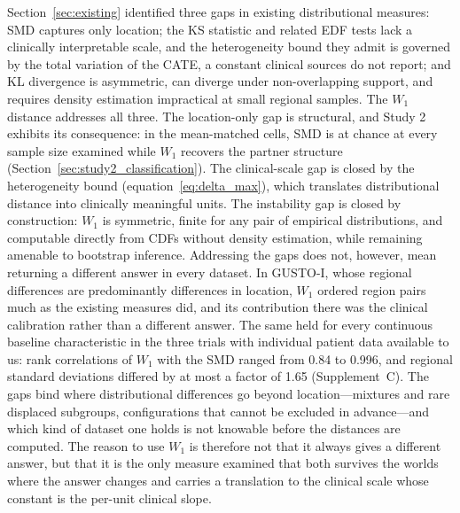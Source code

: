 \documentclass[AMA,Times1COL]{WileyNJDv5}
\begin{document}
Section~\ref{sec:existing} identified three gaps in existing distributional measures: SMD captures only location; the KS statistic and related EDF tests lack a clinically interpretable scale, and the heterogeneity bound they admit is governed by the total variation of the CATE, a constant clinical sources do not report; and KL divergence is asymmetric, can diverge under non-overlapping support, and requires density estimation impractical at small regional samples. The $W_1$ distance addresses all three. The location-only gap is structural, and Study 2 exhibits its consequence: in the mean-matched cells, SMD is at chance at every sample size examined while $W_1$ recovers the partner structure (Section~\ref{sec:study2_classification}). The clinical-scale gap is closed by the heterogeneity bound (equation~\ref{eq:delta_max}), which translates distributional distance into clinically meaningful units. The instability gap is closed by construction: $W_1$ is symmetric, finite for any pair of empirical distributions, and computable directly from CDFs without density estimation, while remaining amenable to bootstrap inference. Addressing the gaps does not, however, mean returning a different answer in every dataset. In GUSTO-I, whose regional differences are predominantly differences in location, $W_1$ ordered region pairs much as the existing measures did, and its contribution there was the clinical calibration rather than a different answer. The same held for every continuous baseline characteristic in the three trials with individual patient data available to us: rank correlations of $W_1$ with the SMD ranged from 0.84 to 0.996, and regional standard deviations differed by at most a factor of 1.65 (Supplement~C). The gaps bind where distributional differences go beyond location---mixtures and rare displaced subgroups, configurations that cannot be excluded in advance---and which kind of dataset one holds is not knowable before the distances are computed. The reason to use $W_1$ is therefore not that it always gives a different answer, but that it is the only measure examined that both survives the worlds where the answer changes and carries a translation to the clinical scale whose constant is the per-unit clinical slope.
\end{document}
